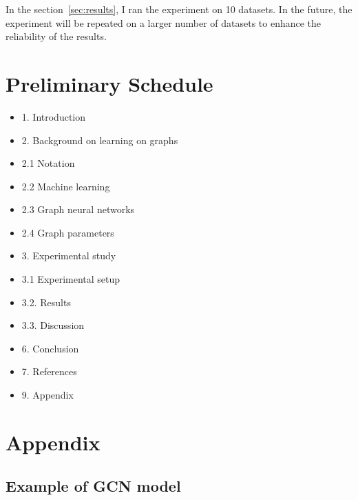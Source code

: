 \documentclass{article}
\begin{document}
In the section~\ref{sec:results}, I ran the experiment on 10 datasets. In the future, the experiment will be repeated on a larger number of datasets to enhance the reliability of the results.

\newpage

\section{Preliminary Schedule} \label{sec:schedule}

\begin{itemize}

\item
  1. Introduction
\item
  2. Background on learning on graphs
\item
  2.1 Notation
\item
  2.2 Machine learning
\item
  2.3 Graph neural networks
\item
  2.4 Graph parameters
\item
  3. Experimental study
\item
  3.1 Experimental setup
\item
  3.2. Results
\item
  3.3. Discussion
\item
  6. Conclusion
\item
  7. References
\item
  9. Appendix

\end{itemize}

\clearpage



\clearpage

\section{Appendix} 
 
\subsection*{Example of GCN model}
\end{document}
